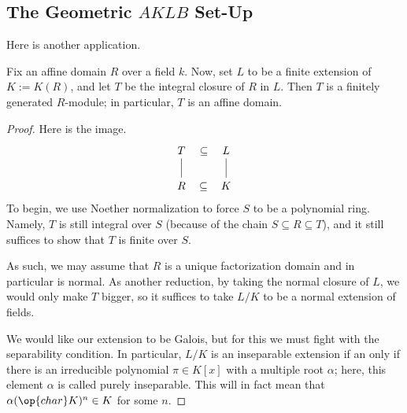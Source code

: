 \subsection{The Geometric \texorpdfstring{$AKLB$}{AKLB} Set-Up}
Here is another application.
\begin{proposition} \label{prop:geometricaklb}
	Fix an affine domain $R$ over a field $k$. Now, set $L$ to be a finite extension of $K:=K(R)$, and let $T$ be the integral closure of $R$ in $L$. Then $T$ is a finitely generated $R$-module; in particular, $T$ is an affine domain.
\end{proposition}
\begin{proof}
	Here is the image.
	\[\begin{tikzcd}
		T & L \\
		R & K
		\arrow[no head, from=2-1, to=1-1]
		\arrow[no head, from=2-2, to=1-2]
		\arrow["\subseteq"{marking}, draw=none, from=2-1, to=2-2]
		\arrow["\subseteq"{marking}, draw=none, from=1-1, to=1-2]
	\end{tikzcd}\]
	To begin, we use Noether normalization to force $S$ to be a polynomial ring. Namely, $T$ is still integral over $S$ (because of the chain $S\subseteq R\subseteq T$), and it still suffices to show that $T$ is finite over $S$.

	As such, we may assume that $R$ is a unique factorization domain and in particular is normal. As another reduction, by taking the normal closure of $L$, we would only make $T$ bigger, so it suffices to take $L/K$ to be a normal extension of fields.

	We would like our extension to be Galois, but for this we must fight with the separability condition. In particular, $L/K$ is an inseparable extension if an only if there is an irreducible polynomial $\pi\in K[x]$ with a multiple root $\alpha$; here, this element $\alpha$ is called purely inseparable. This will in fact mean that $\alpha{(\op{char}K)^n}\in K$ for some $n$.


\end{proof}
